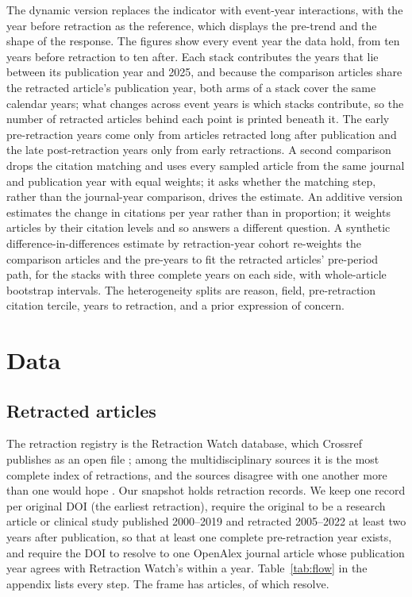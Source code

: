 \documentclass[11pt,letterpaper]{article}
\begin{document}
The dynamic version replaces the indicator with event-year interactions, with the year before retraction as the reference, which displays the pre-trend and the shape of the response. The figures show every event year the data hold, from ten years before retraction to ten after. Each stack contributes the years that lie between its publication year and 2025, and because the comparison articles share the retracted article's publication year, both arms of a stack cover the same calendar years; what changes across event years is which stacks contribute, so the number of retracted articles behind each point is printed beneath it. The early pre-retraction years come only from articles retracted long after publication and the late post-retraction years only from early retractions. A second comparison drops the citation matching and uses every sampled article from the same journal and publication year with equal weights; it asks whether the matching step, rather than the journal-year comparison, drives the estimate. An additive version estimates the change in citations per year rather than in proportion; it weights articles by their citation levels and so answers a different question. A synthetic difference-in-differences estimate by retraction-year cohort \citep{arkhangelsky2021} re-weights the comparison articles and the pre-years to fit the retracted articles' pre-period path, for the stacks with three complete years on each side, with whole-article bootstrap intervals. The heterogeneity splits are reason, field, pre-retraction citation tercile, years to retraction, and a prior expression of concern.

\section{Data}
\subsection{Retracted articles}
The retraction registry is the Retraction Watch database, which Crossref publishes as an open file \citep{retractionwatch2026, hendricks2023crossref}; among the multidisciplinary sources it is the most complete index of retractions, and the sources disagree with one another more than one would hope \citep{schneider2023assessing, ortega2024indexation}. Our snapshot holds \Retractions{} retraction records. We keep one record per original DOI (the earliest retraction), require the original to be a research article or clinical study published 2000--2019 and retracted 2005--2022 at least two years after publication, so that at least one complete pre-retraction year exists, and require the DOI to resolve to one OpenAlex journal article whose publication year agrees with Retraction Watch's within a year. Table~\ref{tab:flow} in the appendix lists every step. The frame has \Frame{} articles, of which \Resolved{} resolve.
\end{document}
